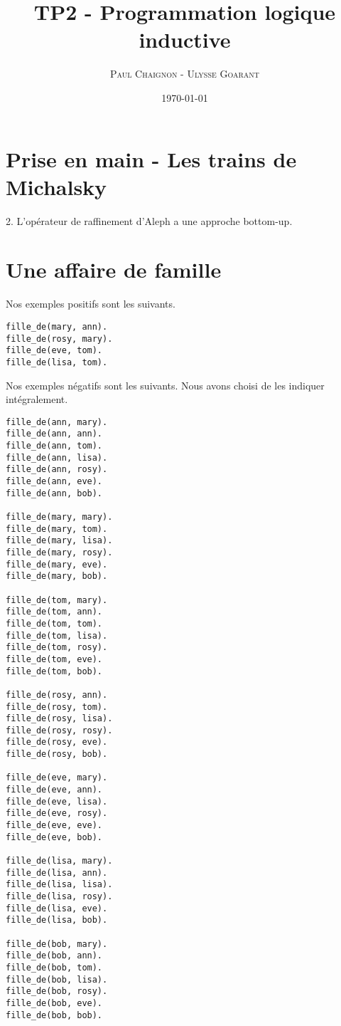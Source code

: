\documentclass[a4paper,12pt]{article}
\title{TP2 - Programmation logique inductive}
\author{\textsc{Paul Chaignon} - \textsc{Ulysse Goarant}}
\date{\today}
\begin{document}
\lstset{language=Prolog}

\maketitle

\section{Prise en main - Les trains de Michalsky}

2. L'opérateur de raffinement d'Aleph a une approche bottom-up.

\section{Une affaire de famille}
Nos exemples positifs sont les suivants.

\begin{lstlisting}[frame=single]
fille_de(mary, ann).
fille_de(rosy, mary).
fille_de(eve, tom).
fille_de(lisa, tom).
\end{lstlisting}

Nos exemples négatifs sont les suivants. Nous avons choisi de les indiquer intégralement.

\begin{lstlisting}[frame=single]
fille_de(ann, mary).
fille_de(ann, ann).
fille_de(ann, tom).
fille_de(ann, lisa).
fille_de(ann, rosy).
fille_de(ann, eve).
fille_de(ann, bob).

fille_de(mary, mary).
fille_de(mary, tom).
fille_de(mary, lisa).
fille_de(mary, rosy).
fille_de(mary, eve).
fille_de(mary, bob).

fille_de(tom, mary).
fille_de(tom, ann).
fille_de(tom, tom).
fille_de(tom, lisa).
fille_de(tom, rosy).
fille_de(tom, eve).
fille_de(tom, bob).

fille_de(rosy, ann).
fille_de(rosy, tom).
fille_de(rosy, lisa).
fille_de(rosy, rosy).
fille_de(rosy, eve).
fille_de(rosy, bob).

fille_de(eve, mary).
fille_de(eve, ann).
fille_de(eve, lisa).
fille_de(eve, rosy).
fille_de(eve, eve).
fille_de(eve, bob).

fille_de(lisa, mary).
fille_de(lisa, ann).
fille_de(lisa, lisa).
fille_de(lisa, rosy).
fille_de(lisa, eve).
fille_de(lisa, bob).

fille_de(bob, mary).
fille_de(bob, ann).
fille_de(bob, tom).
fille_de(bob, lisa).
fille_de(bob, rosy).
fille_de(bob, eve).
fille_de(bob, bob).
\end{lstlisting}
\end{document}
